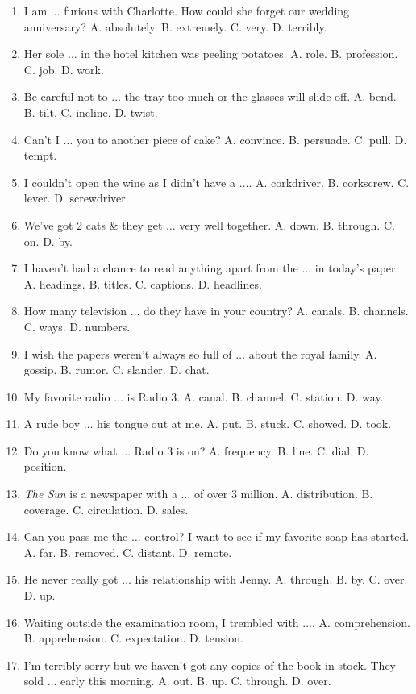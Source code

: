 \documentclass{article}
\numberwithin{equation}{section}
\begin{document}
\begin{enumerate}[leftmargin=2mm]
	\item I am $\ldots$ furious with Charlotte. How could she forget our wedding anniversary? A. absolutely. B. extremely. C. very. D. terribly.
	\item Her sole $\ldots$ in the hotel kitchen was peeling potatoes. A. role. B. profession. C. job. D. work.
	\item Be careful not to $\ldots$ the tray too much or the glasses will slide off. A. bend. B. tilt. C. incline. D. twist.
	\item Can't I $\ldots$ you to another piece of cake? A. convince. B. persuade. C. pull. D. tempt.
	\item I couldn't open the wine as I didn't have a $\ldots$. A. corkdriver. B. corkscrew. C. lever. D. screwdriver.
	\item We've got 2 cats \& they get $\ldots$ very well together. A. down. B. through. C. on. D. by.
	\item I haven't had a chance to read anything apart from the $\ldots$ in today's paper. A. headings. B. titles. C. captions. D. headlines.
	\item How many television $\ldots$ do they have in your country? A. canals. B. channels. C. ways. D. numbers.
	\item I wish the papers weren't always so full of $\ldots$ about the royal family. A. gossip. B. rumor. C. slander. D. chat.
	\item My favorite radio $\ldots$ is Radio 3. A. canal. B. channel. C. station. D. way.
	\item A rude boy $\ldots$ his tongue out at me. A. put. B. stuck. C. showed. D. took.
	\item Do you know what $\ldots$ Radio 3 is on? A. frequency. B. line. C. dial. D. position.
	\item \textit{The Sun} is a newspaper with a $\ldots$ of over 3 million. A. distribution. B. coverage. C. circulation. D. sales.
	\item Can you pass me the $\ldots$ control? I want to see if my favorite soap has started. A. far. B. removed. C. distant. D. remote.
	\item He never really got $\ldots$ his relationship with Jenny. A. through. B. by. C. over. D. up.
	\item Waiting outside the examination room, I trembled with $\ldots$. A. comprehension. B. apprehension. C. expectation. D. tension.
	\item I'm terribly sorry but we haven't got any copies of the book in stock. They sold $\ldots$ early this morning. A. out. B. up. C. through. D. over.

\end{enumerate}
\end{document}
